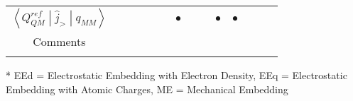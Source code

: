 \documentclass{article}
\begin{document}
\begin{table}[tbp]
\begin{threeparttable}
\begin{tabular}{cccccccccccccc}
\rowcolor{Gray}
$\left< Q_{QM}^{ref} \middle| \hat{j}_{>} \middle| q_{MM} \right>$        &                     &                        &                                     &                                                                                                                          &                        & $\bullet$                           &                                                   &                        & $\bullet$          & $\bullet$         &                      &                   &                  \\
Comments                                                                  &                     &                        & \cite{giese_ambient-potential_2016} & \cite{nam_efficient_2005, walker_implementation_2008, holden_periodic_2013, ojeda-may_isotropic_2014, zhou_chapter_2016} &                        & \cite{giese_ambient-potential_2016} & \cite{seabra_implementation_2007, kubar_new_2015} &                        &                    &                   & \cite{fang_new_2015} &                   &                  \\ \hline
\addlinespace[1ex]
\end{tabular}
\begin{tablenotes}
\footnotesize
\item[*] EEd = Electrostatic Embedding with Electron Density, EEq = Electrostatic Embedding with Atomic Charges, ME = Mechanical Embedding
\end{tablenotes}
\end{threeparttable}
\end{table}

\printbibliography
\end{document}
